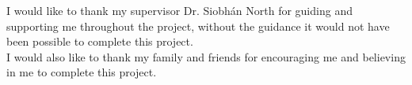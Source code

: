 \documentclass[../main.tex]{subfiles}
\begin{document}
\raggedright

I would like to thank my supervisor Dr. Siobhán North for guiding and supporting me throughout the project, without the guidance it would not have been possible to complete this project. \\[2mm]
I would also like to thank my family and friends for encouraging me and believing in me to complete this project. 
\end{document}
